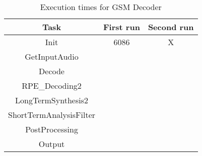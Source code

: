 \documentclass[a4paper, 12pt]{article}
\begin{document}
\begin{table}[h]
  \centering
  \begin{tabular}{c c c}
    \hline
    Task & First run & Second run \\
    \hline
    Init & 6086 & X \\
    GetInputAudio & & \\
    Decode & & \\
    RPE\_Decoding2 & & \\
    LongTermSynthesis2 & & \\
    ShortTermAnalysisFilter & & \\
    PostProcessing & & \\
    Output & & \\
  \end{tabular}
  \caption{Execution times for GSM Decoder}
\end{table}
\end{document}
